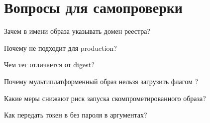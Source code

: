 \section*{Вопросы для самопроверки}
\begin{selfcheck}
  \item Зачем в имени образа указывать домен реестра?
  \item Почему  не подходит для production?
  \item Чем тег отличается от digest?
  \item Почему мультиплатформенный образ нельзя загрузить флагом
        ?
  \item Какие меры снижают риск запуска скомпрометированного образа?
  \item Как передать токен в  без пароля в аргументах?
\end{selfcheck}
